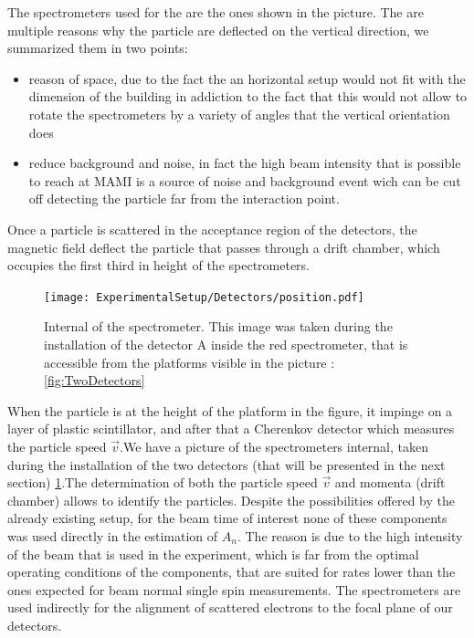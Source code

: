 The spectrometers used for the \transv are the ones shown in the picture. The are multiple reasons why the particle are deflected on the vertical direction, we summarized them in two points: 
\begin{itemize}
\item reason of space, due to the fact the an horizontal setup would not fit with the dimension of the building in addiction to the fact that this would not allow to rotate the spectrometers by a variety of angles that the vertical orientation does
\item reduce background and noise, in fact the high beam intensity that is possible to reach at MAMI is a source of noise and background event wich can be cut off detecting the particle far from the interaction point. 
\end{itemize}      

Once a particle is scattered in the acceptance region of the detectors, the magnetic field deflect the particle that passes through a drift chamber, which occupies the first third in height of the spectrometers. 
\begin{figure}
\centering
\texttt{[image: ExperimentalSetup/Detectors/position.pdf]}
\caption{Internal of the spectrometer. This image was taken during the installation of the detector A inside the red spectrometer, that is accessible from the platforms visible in the picture : \ref{fig:TwoDetectors}}
\vspace{-170pt}
\label{fig:internal}
\end{figure}

When the particle is at the height of the platform in the figure, it impinge on a layer of plastic scintillator, and after that a Cherenkov detector which measures the particle speed $\vec{v}$.We have a picture of the spectrometers internal, taken during the installation of the two detectors (that will be presented in the next section) \ref{fig:internal}.The determination of both the particle speed $\vec{v}$ and momenta (drift chamber) allows to identify the particles. Despite the possibilities offered by the already existing setup, for the beam time of interest none of these components was used directly in the estimation of $A_{n}$. The reason is due to the high intensity of the beam that is used in the experiment, which is far from the optimal operating conditions of the components, that are suited for rates lower than the ones expected for beam normal single spin measurements. The spectrometers are used indirectly for the alignment of scattered electrons to the focal plane of our detectors.

